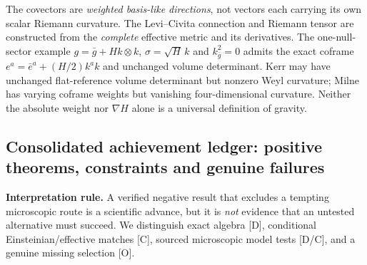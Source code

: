 \documentclass[11pt,a4paper]{article}
\begin{document}
The covectors are \emph{weighted basis-like directions}, not vectors each carrying its own scalar Riemann curvature. The Levi--Civita connection and Riemann tensor are constructed from the \emph{complete} effective metric and its derivatives. The one-null-sector example $g=\bar g+Hk\otimes k$, $\sigma=\sqrt{H}\,k$ and $k^2_{\bar g}=0$ admits the exact coframe $e^a=\bar e^a+(H/2)k^ak$ and unchanged volume determinant. Kerr may have unchanged flat-reference volume determinant but nonzero Weyl curvature; Milne has varying coframe weights but vanishing four-dimensional curvature. Neither the absolute weight nor $\nabla H$ alone is a universal definition of gravity.

\subsection{Consolidated achievement ledger: positive theorems, constraints and genuine failures}
\label{sec:v13-ledger}
\textbf{Interpretation rule.} A verified negative result that excludes a tempting microscopic route is a scientific advance, but it is \emph{not} evidence that an untested alternative must succeed. We distinguish exact algebra [D], conditional Einsteinian/effective matches [C], sourced microscopic model tests [D/C], and a genuine missing selection [O].
\end{document}
